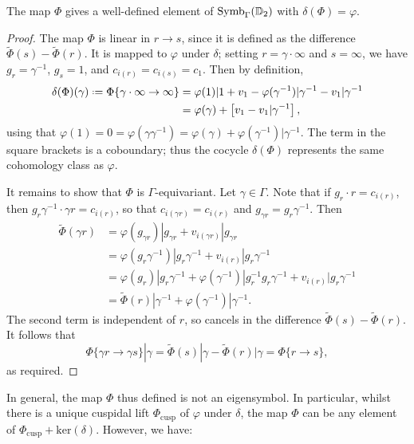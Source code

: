 \documentclass[a4paper,11pt]{article}
\numberwithin{equation}{section}
\begin{document}
	
	\begin{proposition}
		The map $\Phi$ gives a well-defined element of $\mathrm{Symb}_{\Gamma}(\mathbb{D}_2)$ with $\delta(\Phi) = \varphi$.
	\end{proposition}
	\begin{proof}
		The map $\Phi$ is linear in $r \to s$, since it is defined as the difference $\widetilde{\Phi}(s) - \widetilde{\Phi}(r)$. It is mapped to $\varphi$ under $\delta$; setting $r = \gamma\cdot\infty$ and $s = \infty$, we have $g_r = \gamma^{-1}$, $g_s = 1$, and $c_{i(r)} = c_{i(s)} = c_1$. Then by definition,
		\begin{align*}
			\delta(\Phi)(\gamma) \defeq \Phi\{\gamma\cdot\infty \to \infty\} &= \varphi(1)|1 + v_1 - \varphi(\gamma^{-1})|\gamma^{-1} - v_1|\gamma^{-1}\\
									&= \varphi(\gamma) + \left[v_1 - v_1|\gamma^{-1}\right],
		\end{align*}
		using that $\varphi(1) = 0 = \varphi(\gamma\gamma^{-1}) = \varphi(\gamma) + \varphi(\gamma^{-1})|\gamma^{-1}$. The term in the square brackets is a coboundary; thus the cocycle $\delta(\Phi)$ represents the same cohomology class as $\varphi$.
		
		It remains to show that $\Phi$ is $\Gamma$-equivariant. Let $\gamma \in \Gamma$. Note that if $g_r \cdot r = c_{i(r)}$, then $g_r\gamma^{-1} \cdot \gamma r = c_{i(r)}$, so that $c_{i(\gamma r)} = c_{i(r)}$ and $g_{\gamma r} = g_r\gamma^{-1}$. Then
		\begin{align*}
			\widetilde{\Phi}(\gamma r) &= \varphi(g_{\gamma r})|g_{\gamma r} + v_{i(\gamma r)}|g_{\gamma r}\\
					 &= \varphi(g_r \gamma^{-1})|g_r\gamma^{-1} + v_{i(r)}|g_r\gamma^{-1}\\
						&= \varphi(g_r)|g_r\gamma^{-1} + \varphi(\gamma^{-1})|g_r^{-1}g_r\gamma^{-1} + v_{i(r)}|g_r\gamma^{-1}\\
						&= \widetilde{\Phi}(r)|\gamma^{-1} + \varphi(\gamma^{-1})|\gamma^{-1}.
		\end{align*}
		The second term is independent of $r$, so cancels in the difference $\widetilde{\Phi}(s) - \widetilde{\Phi}(r)$. It follows that
		\[
			\Phi\{\gamma r \to \gamma s\}|\gamma = \widetilde{\Phi}(s)|\gamma - \widetilde{\Phi}(r)|\gamma = \Phi\{r\to s\},
		\]
		as required.
	\end{proof}

In general, the map $\Phi$ thus defined is not an eigensymbol. In particular, whilst there is a unique cuspidal lift $\Phi_{\mathrm{cusp}}$ of $\varphi$ under $\delta$, the map $\Phi$ can be any element of $\Phi_{\mathrm{cusp}} + \mathrm{ker}(\delta)$. However, we have:
\end{document}
